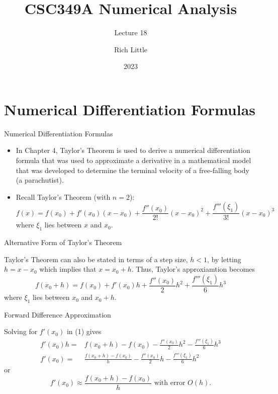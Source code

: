 \documentclass[12pt]{beamer}
\title[CSC349A Numerical Analysis]{CSC349A Numerical Analysis}
\subtitle[Lecture 18]{Lecture 18}
\date[2023]{2023}
\author[R. Little]{Rich Little}
\institute[University of Victoria]{University of Victoria}
\begin{document}
\frame{\maketitle} %



\section{Numerical Differentiation Formulas}

\begin{frame}{Numerical Differentiation Formulas}
\begin{itemize}
\item{In Chapter 4, Taylor's Theorem is used to derive a numerical differentiation formula that was used to approximate a derivative in a mathematical model that was developed to determine the terminal velocity of a free-falling body (a parachutist).}

\item{Recall Taylor's Theorem (with $n=2$):
\[
f(x) = f(x_0) + f'(x_0)(x-x_0) + \frac{f''(x_0)}{2!}(x-x_0)^2 + \frac{f'''(\xi_1)}{3!}(x-x_0)^3
\]
where $\xi_1$ lies between $x$ and $x_0$.}
\end{itemize}

\end{frame}

\begin{frame}{Alternative Form of Taylor's Theorem}

Taylor's Theorem can also be stated in terms of a step size, $h<1$, by letting $h=x-x_0$ which implies that $x=x_0+h$. Thus, Taylor's approxiamtion becomes
\begin{equation}
f(x_0+h) = f(x_0) + f'(x_0)h + \frac{f''(x_0)}{2}h^2 + \frac{f'''(\xi_1)}{6}h^3
\end{equation}
where $\xi_1$ lies between $x_0$ and $x_0+h$.

\end{frame}

\begin{frame}{Forward Difference Approximation}

Solving for $f'(x_0)$ in (1) gives
\begin{align*}
f'(x_0)h =& f(x_0+h) - f(x_0) - \frac{f''(x_0)}{2}h^2 - \frac{f'''(\xi_1)}{6}h^3 \\
f'(x_0) =& \frac{f(x_0+h) - f(x_0)}{h}  - \frac{f''(x_0)}{2}h - \frac{f'''(\xi_1)}{6}h^2
\end{align*}
or
\[
f'(x_0) \approx \frac{f(x_0+h) - f(x_0)}{h} \text{ with error } O(h).
\]

\end{frame}
\end{document}
